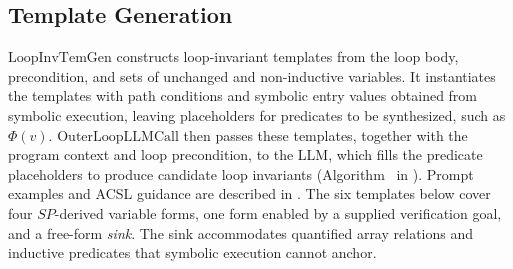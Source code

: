 \subsection{Template Generation}
\label{sec:template}

{$\mathrm{LoopInvTemGen}$ constructs loop-invariant templates from the loop body, precondition, and sets of unchanged and non-inductive variables. It instantiates the templates with path conditions and symbolic entry values obtained from symbolic execution, leaving placeholders for predicates to be synthesized, such as $\Phi(v)$. $\mathrm{OuterLoopLLMCall}$ then passes these templates, together with the program context and loop precondition, to the LLM, which fills the predicate placeholders to produce candidate loop invariants (Algorithm~ in ).} Prompt examples and ACSL guidance are described in {}.
The six templates below cover four $\textit{SP}$-derived variable forms, one form enabled by a supplied verification goal, and a free-form \emph{sink}. The sink accommodates quantified array relations and inductive predicates that symbolic execution cannot anchor.

